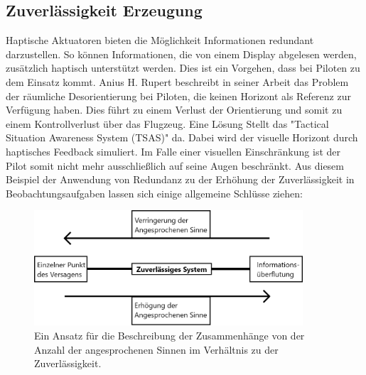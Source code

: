 \documentclass{llncs}					%
\begin{document}
\subsection{Zuverlässigkeit Erzeugung}
Haptische Aktuatoren bieten die Möglichkeit Informationen redundant darzustellen. So können Informationen, die von einem Display abgelesen werden, zusätzlich haptisch unterstützt werden. Dies ist ein Vorgehen, dass bei Piloten zu dem Einsatz kommt.
Anius H. Rupert\cite{rupert2000instrumentation} beschreibt in seiner Arbeit das Problem der räumliche Desorientierung bei Piloten, die keinen Horizont als Referenz zur Verfügung haben. Dies führt zu einem Verlust der Orientierung und somit zu einem Kontrollverlust über das Flugzeug. Eine Lösung Stellt das "Tactical Situation Awareness System (TSAS)"\cite{rupert2000instrumentation} da. Dabei wird der visuelle Horizont durch haptisches Feedback simuliert\cite{rupert2000instrumentation}. Im Falle einer visuellen Einschränkung ist der Pilot somit nicht mehr ausschließlich auf seine Augen beschränkt.
Aus diesem Beispiel der Anwendung von Redundanz zu der Erhöhung der Zuverlässigkeit in Beobachtungsaufgaben lassen sich einige allgemeine Schlüsse ziehen:

\begin{figure}[htbp]
	\begin{center}
		\includegraphics[width = 10cm]{Grafiken/Sinne-Redundanz-Verhaeltnis.png}
		\caption{Ein Ansatz für die Beschreibung der Zusammenhänge von der Anzahl der angesprochenen Sinnen im Verhältnis zu der Zuverlässigkeit.}
		\label{Sinne_Redundanz_Verhaeltnis}
	\end{center}
\end{figure}
\end{document}
